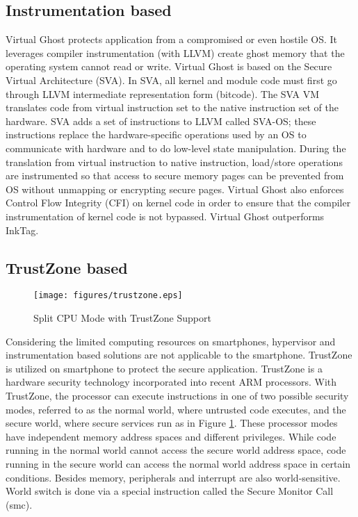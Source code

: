\subsection{Instrumentation based}

Virtual Ghost protects application from a compromised or even hostile OS. It
leverages compiler instrumentation (with LLVM) create ghost memory that the
operating system cannot read or write. Virtual Ghost is based on the Secure
Virtual Architecture (SVA). In SVA, all kernel and module code must first go
through LLVM intermediate representation form (bitcode). The SVA VM translates
code from virtual instruction set to the native instruction set of the hardware.
SVA adds a set of instructions to LLVM called SVA-OS; these instructions replace
the hardware-specific operations used by an OS to communicate with hardware and
to do low-level state manipulation. During the translation from virtual
instruction to native instruction, load/store operations are instrumented so
that access to secure memory pages can be prevented from OS without unmapping or
encrypting secure pages. Virtual Ghost also enforces Control Flow Integrity
(CFI) on kernel code in order to ensure that the compiler instrumentation of
kernel code is not bypassed. Virtual Ghost outperforms InkTag.

\subsection{TrustZone based}

\begin{figure}[htb]
\centering
\texttt{[image: figures/trustzone.eps]}
\caption{Split CPU Mode with TrustZone Support}
\label{fig:trustzone}
\end{figure}

Considering the limited computing resources on smartphones, hypervisor and
instrumentation based solutions are not applicable to the smartphone. TrustZone
is utilized on smartphone to protect the secure application. TrustZone is a
hardware security technology incorporated into recent ARM processors. With
TrustZone, the processor can execute instructions in one of two possible
security modes, referred to as the normal world, where untrusted code executes,
and the secure world, where secure services run as in Figure
\ref{fig:trustzone}. These processor modes have independent memory address
spaces and different privileges. While code running in the normal world cannot
access the secure world address space, code running in the secure world can
access the normal world address space in certain conditions. Besides memory,
peripherals and interrupt are also world-sensitive. World switch is done via a
special instruction called the Secure Monitor Call (smc).

